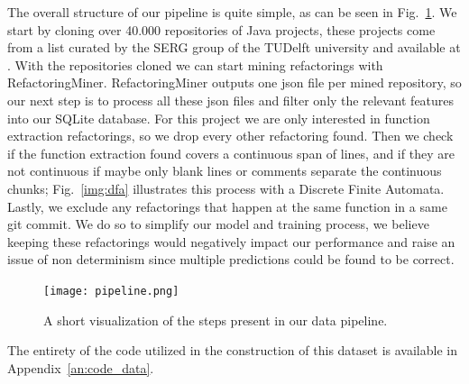 The overall structure of our pipeline is quite simple, as can be seen in Fig.~\ref{pipeline}. We start by cloning over 40.000 repositories of Java projects, these projects come from a list curated by the SERG group of the TUDelft university and available at \citet{lista_repos}.
With the repositories cloned we can start mining refactorings with RefactoringMiner. 
RefactoringMiner outputs one json file per mined repository, so our next step is to process all these json files and filter only the relevant features into our SQLite database. For this project we are only interested in function extraction refactorings, so we drop every other refactoring found. Then we check if the function extraction found covers a continuous span of lines, and if they are not continuous if maybe only blank lines or comments separate the continuous chunks; Fig.~\ref{img:dfa} illustrates this process with a Discrete Finite Automata. Lastly, we exclude any refactorings that happen at the same function in a same git commit. We do so to simplify our model and training process, we believe keeping these refactorings would negatively impact our performance and raise an issue of non determinism since multiple predictions could be found to be correct.

\begin{figure}[!ht]
\centerline{\texttt{[image: pipeline.png]}   }
\caption{A short visualization of the steps present in our data pipeline.}
\label{pipeline}
\end{figure}


The entirety of the code utilized in the construction of this dataset is available in Appendix~\ref{an:code_data}.





